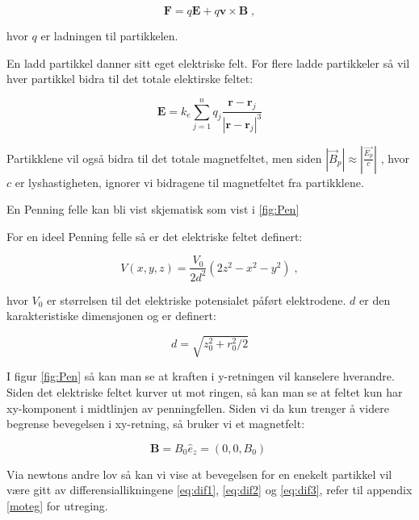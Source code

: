 \documentclass[reprint,english,notitlepage, nofootinbib]{revtex4-1}  %
\begin{document}
\begin{equation}\label{F}
\mathbf{F} = q\mathbf{E} + q\mathbf{v}\times \mathbf{B} \; ,
\end{equation}

hvor $q$ er ladningen til partikkelen. 

En ladd partikkel danner sitt eget elektriske felt. For flere ladde partikkeler så vil hver partikkel bidra til det totale elektirske feltet:

\begin{equation}\label{Esum}
\mathbf{E} = k_e \sum_{j=1}^{n} q_j \frac{\mathbf{r} - \mathbf{r}_j}{\left | \mathbf{r} - \mathbf{r}_j \right |^3} 
\end{equation}

Partikklene vil også bidra til det totale magnetfeltet, men siden \tiny{${\left |\vec{B}_p \right | \approx \left | \frac{\vec{E_p}}{c} \right |}$} \normalsize{}, hvor $c$ er lyshastigheten, ignorer vi bidragene til magnetfeltet fra partikklene.   

En Penning felle kan bli vist skjematisk som vist i \ref{fig:Pen}

For en ideel Penning felle så er det elektriske feltet definert:

\begin{equation}\label{V}
V(x,y,z) = \frac{V_0}{2d^2}\left (2z^2 - x^2 -y^2 \right ) \; ,
\end{equation}

hvor $V_0$ er størrelsen til det elektriske potensialet påført elektrodene. $d$ er den karakteristiske dimensjonen og er definert:

\begin{equation}\label{d}
d = \sqrt{z_0^2 + r_0^2/2}
\end{equation}

I figur \ref{fig:Pen} så kan man se at kraften i y-retningen vil kanselere hverandre. Siden det elektriske feltet kurver ut mot ringen, så kan man se at feltet kun har xy-komponent i midtlinjen av penningfellen. Siden vi da kun trenger å videre begrense bevegelsen i xy-retning, så bruker vi et magnetfelt:

\begin{equation}\label{B}
\mathbf{B} = B_0\hat{e}_z = \left ( 0, 0, B_0 \right ) \;
\end{equation}

Via newtons andre lov så kan vi vise at bevegelsen for en enekelt partikkel vil være gitt av differensiallikningene \ref{eq:dif1}, \ref{eq:dif2} og \ref{eq:dif3}, refer til appendix \ref{moteg} for utreging. 
\end{document}
